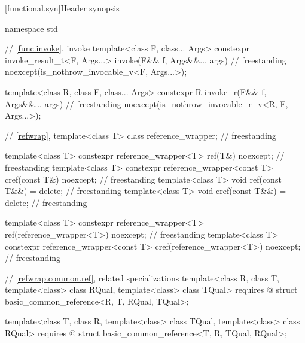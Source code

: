 [functional.syn]{Header  synopsis}

%
%
%
\begin{codeblock}
namespace std {
  // \ref{func.invoke}, invoke
  template<class F, class... Args>
    constexpr invoke_result_t<F, Args...> invoke(F&& f, Args&&... args)             // freestanding
      noexcept(is_nothrow_invocable_v<F, Args...>);

  template<class R, class F, class... Args>
    constexpr R invoke_r(F&& f, Args&&... args)                                     // freestanding
      noexcept(is_nothrow_invocable_r_v<R, F, Args...>);

  // \ref{refwrap}, 
  template<class T> class reference_wrapper;                                        // freestanding

  template<class T> constexpr reference_wrapper<T> ref(T&) noexcept;                // freestanding
  template<class T> constexpr reference_wrapper<const T> cref(const T&) noexcept;   // freestanding
  template<class T> void ref(const T&&) = delete;                                   // freestanding
  template<class T> void cref(const T&&) = delete;                                  // freestanding

  template<class T>
    constexpr reference_wrapper<T> ref(reference_wrapper<T>) noexcept;              // freestanding
  template<class T>
    constexpr reference_wrapper<const T> cref(reference_wrapper<T>) noexcept;       // freestanding

  // \ref{refwrap.common.ref},  related specializations
  template<class R, class T, template<class> class RQual, template<class> class TQual>
    requires @\seebelow@
  struct basic_common_reference<R, T, RQual, TQual>;

  template<class T, class R, template<class> class TQual, template<class> class RQual>
    requires @\seebelow@
  struct basic_common_reference<T, R, TQual, RQual>;

}
\end{codeblock}
